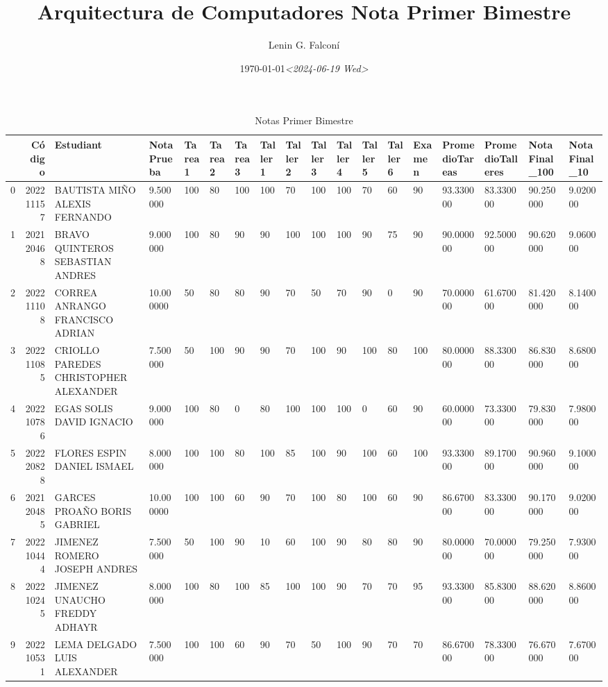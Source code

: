 \documentclass{article}
\author{Lenin G. Falconí}
\date{\today \textit{<2024-06-19 Wed>}}
\title{Arquitectura de Computadores Nota Primer Bimestre}
\begin{document}
\maketitle
\begin{table}
\caption{Notas Primer Bimestre}
\scriptsize
\begin{tabularx}{\textwidth}{lrp{}XXXXXXXXXXXXXXX}
\toprule
 & Código & Estudiant & NotaPrueba & Tarea1 & Tarea2 & Tarea3 & Taller1 & Taller2 & Taller3 & Taller4 & Taller5 & Taller6 & Examen & PromedioTareas & PromedioTalleres & NotaFinal\_100 & NotaFinal\_10 \\
\midrule
0 & 202211157 & BAUTISTA MIÑO ALEXIS FERNANDO & 9.500000 & 100 & 80 & 100 & 100 & 70 & 100 & 100 & 70 & 60 & 90 & 93.330000 & 83.330000 & 90.250000 & 9.020000 \\
1 & 202120468 & BRAVO QUINTEROS SEBASTIAN ANDRES & 9.000000 & 100 & 80 & 90 & 90 & 100 & 100 & 100 & 90 & 75 & 90 & 90.000000 & 92.500000 & 90.620000 & 9.060000 \\
2 & 202211108 & CORREA ANRANGO FRANCISCO ADRIAN & 10.000000 & 50 & 80 & 80 & 90 & 70 & 50 & 70 & 90 & 0 & 90 & 70.000000 & 61.670000 & 81.420000 & 8.140000 \\
3 & 202211085 & CRIOLLO PAREDES CHRISTOPHER ALEXANDER & 7.500000 & 50 & 100 & 90 & 90 & 70 & 100 & 90 & 100 & 80 & 100 & 80.000000 & 88.330000 & 86.830000 & 8.680000 \\
4 & 202210786 & EGAS SOLIS DAVID IGNACIO & 9.000000 & 100 & 80 & 0 & 80 & 100 & 100 & 100 & 0 & 60 & 90 & 60.000000 & 73.330000 & 79.830000 & 7.980000 \\
5 & 202220828 & FLORES ESPIN DANIEL ISMAEL & 8.000000 & 100 & 100 & 80 & 100 & 85 & 100 & 90 & 100 & 60 & 100 & 93.330000 & 89.170000 & 90.960000 & 9.100000 \\
6 & 202120485 & GARCES PROAÑO BORIS GABRIEL & 10.000000 & 100 & 100 & 60 & 90 & 70 & 100 & 80 & 100 & 60 & 90 & 86.670000 & 83.330000 & 90.170000 & 9.020000 \\
7 & 202210444 & JIMENEZ ROMERO JOSEPH ANDRES & 7.500000 & 50 & 100 & 90 & 10 & 60 & 100 & 90 & 80 & 80 & 90 & 80.000000 & 70.000000 & 79.250000 & 7.930000 \\
8 & 202210245 & JIMENEZ UNAUCHO FREDDY ADHAYR & 8.000000 & 100 & 80 & 100 & 85 & 100 & 100 & 90 & 70 & 70 & 95 & 93.330000 & 85.830000 & 88.620000 & 8.860000 \\
9 & 202210531 & LEMA DELGADO LUIS ALEXANDER & 7.500000 & 100 & 100 & 60 & 90 & 70 & 50 & 100 & 90 & 70 & 70 & 86.670000 & 78.330000 & 76.670000 & 7.670000 \\

\end{tabularx}
\end{table}
\end{document}
